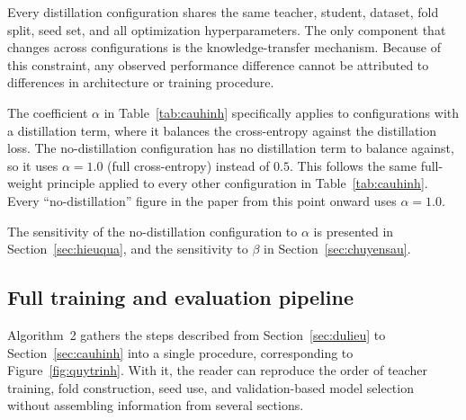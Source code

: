 Every distillation configuration shares the same teacher, student,
dataset, fold split, seed set, and all optimization hyperparameters.
The only component that changes across configurations is the
knowledge-transfer mechanism. Because of this constraint, any
observed performance difference cannot be attributed to differences
in architecture or training procedure.

The coefficient $\alpha$ in Table~\ref{tab:cauhinh} specifically
applies to configurations with a distillation term, where it
balances the cross-entropy against the distillation loss. The no-distillation configuration has no distillation term to balance
against, so it uses $\alpha = 1.0$ (full cross-entropy) instead of $0.5$.
This follows the same full-weight principle applied to every other
configuration in Table~\ref{tab:cauhinh}. Every ``no-distillation''
figure in the paper from this point onward uses $\alpha = 1.0$.

The sensitivity of the no-distillation configuration to $\alpha$ is
presented in Section~\ref{sec:hieuqua}, and the sensitivity to $\beta$
in Section~\ref{sec:chuyensau}.

\subsection{Full training and evaluation pipeline}
\label{sec:pipeline}

Algorithm~2 gathers the steps described from Section~\ref{sec:dulieu}
to Section~\ref{sec:cauhinh} into a single procedure, corresponding to
Figure~\ref{fig:quytrinh}. With it, the reader can reproduce the order
of teacher training, fold construction, seed use, and validation-based
model selection without assembling information from several sections.

